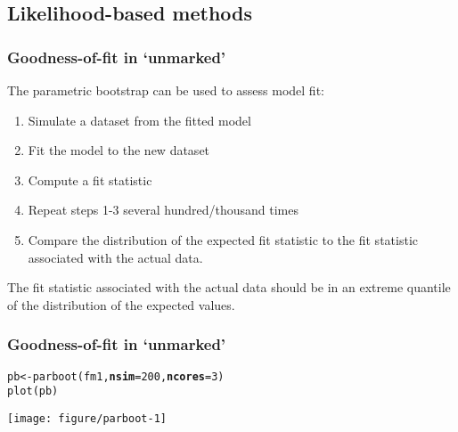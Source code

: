 \documentclass[color=usenames,dvipsnames]{beamer}\usepackage[]{graphicx}\usepackage[]{color}
\makeatletter
\newcommand{\hlnum}[1]{\textcolor[rgb]{0.69,0.494,0}{#1}}%
\newcommand{\hlstd}[1]{\textcolor[rgb]{0,0,0}{#1}}%
\newcommand{\hlkwb}[1]{\textcolor[rgb]{0,0.341,0.682}{#1}}%
\newcommand{\hlkwc}[1]{\textcolor[rgb]{0,0,0}{\textbf{#1}}}%
\newcommand{\hlkwd}[1]{\textcolor[rgb]{0.004,0.004,0.506}{#1}}%
\newenvironment{kframe}{%
 \def\at@end@of@kframe{}%
 \ifinner\ifhmode%
  \def\at@end@of@kframe{\end{minipage}}%
  \begin{minipage}{\columnwidth}%
 \fi\fi%
 \def\FrameCommand##1{\hskip\@totalleftmargin \hskip-\fboxsep
 \colorbox{shadecolor}{##1}\hskip-\fboxsep
     \hskip-\linewidth \hskip-\@totalleftmargin \hskip\columnwidth}%
 \MakeFramed {\advance\hsize-\width
   \@totalleftmargin\z@ \linewidth\hsize
   \@setminipage}}%
 {\par\unskip\endMakeFramed%
 \at@end@of@kframe}
\newenvironment{knitrout}{}{} %
\makeatother
\begin{document}
\subsection{Likelihood-based methods}



\begin{frame}[fragile]
  \frametitle{Goodness-of-fit in `unmarked'}
  The parametric bootstrap can be used to assess model fit:
  \begin{enumerate}
    \item Simulate a dataset from the fitted model
    \item Fit the model to the new dataset
    \item Compute a fit statistic
    \item Repeat steps 1-3 several hundred/thousand times
    \item Compare the distribution of the \alert{expected} fit
      statistic to the fit statistic associated with
      the actual data. 
  \end{enumerate}
  The fit statistic associated with the actual data should be in an
  extreme quantile of the distribution of the expected values.
\end{frame}




\begin{frame}[fragile]
  \frametitle{Goodness-of-fit in `unmarked'}
\begin{knitrout}\small
{}\color{fgcolor}\begin{kframe}
\begin{alltt}
\hlstd{pb} \hlkwb{<-} \hlkwd{parboot}\hlstd{(fm1,} \hlkwc{nsim}\hlstd{=}\hlnum{200}\hlstd{,} \hlkwc{ncores}\hlstd{=}\hlnum{3}\hlstd{)}
\hlkwd{plot}\hlstd{(pb)}
\end{alltt}
\end{kframe}

{\centering \texttt{[image: figure/parboot-1]} 

}



\end{knitrout}
\end{frame}




\end{document}
